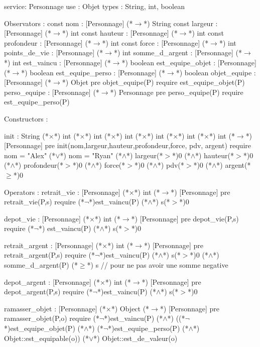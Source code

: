 \documentclass[a4paper, 11pt]{report}
\begin{document}
\begin{Spe}
service: Personnage
use : Objet
types : String, int, boolean

Observators : 
	const nom : [Personnage] (*$\rightarrow$*) String
	const largeur : [Personnage] (*$\rightarrow$*) int
	const hauteur : [Personnage] (*$\rightarrow$*) int
	const profondeur : [Personnage] (*$\rightarrow$*) int
	const force : [Personnage] (*$\rightarrow$*) int 
	points_de_vie : [Personnage] (*$\rightarrow$*) int
	somme_d_argent : [Personnage] (*$\rightarrow$*) int 
	est_vaincu : [Personnage] (*$\rightarrow$*) boolean 
	est_equipe_objet : [Personnage] (*$\rightarrow$*) boolean
	est_equipe_perso : [Personnage] (*$\rightarrow$*) boolean 
	objet_equipe : [Personnage] (*$\rightarrow$*) Objet
		pre objet_equipe(P) require est_equipe_objet(P)
	perso_equipe : [Personnage] (*$\rightarrow$*) Personnage
		pre perso_equipe(P) require est_equipe_perso(P) 

Constructors : 

	init : String (*$\times$*) int (*$\times$*) int (*$\times$*) int (*$\times$*) int (*$\times$*) int (*$\times$*) int (*$\rightarrow$*) [Personnage]
		pre init(nom,largeur,hauteur,profondeur,force, pdv, argent) require nom = "Alex" (*$\lor$*) nom = "Ryan" (*$\land$*) largeur(*$>$*)0 (*$\land$*) hauteur(*$>$*)0 (*$\land$*) profondeur(*$>$*)0 (*$\land$*) force(*$>$*)0 (*$\land$*) pdv(*$>$*)0 (*$\land$*) argent(*$\ge$*)0 

Operators :
	retrait_vie :  [Personnage] (*$\times$*) int (*$\rightarrow$*) [Personnage]
		pre retrait_vie(P,s) require (*$\lnot$*)est_vaincu(P) (*$\land$*) s(*$>$*)0
		
	depot_vie : [Personnage] (*$\times$*) int (*$\rightarrow$*) [Personnage]
		pre depot_vie(P,s) require (*$\lnot$*) est_vaincu(P) (*$\land$*) s(*$>$*)0
		
	retrait_argent :  [Personnage] (*$\times$*) int (*$\rightarrow$*) [Personnage]
		pre retrait_argent(P,s) require (*$\lnot$*)est_vaincu(P) (*$\land$*) s(*$>$*)0 (*$\land$*) somme_d_argent(P) (*$\ge$*) s // pour ne pas avoir une somme negative
		
	depot_argent : [Personnage] (*$\times$*) int (*$\rightarrow$*) [Personnage]
		pre depot_argent(P,s) require (*$\lnot$*)est_vaincu(P) (*$\land$*) s(*$>$*)0
		
	ramasser_objet : [Personnage] (*$\times$*) Object (*$\rightarrow$*) [Personnage]
		pre ramasser_objet(P,o) require (*$\lnot$*)est_vaincu(P) (*$\land$*) ((*$\lnot$*)est_equipe_objet(P) (*$\land$*)  (*$\lnot$*)est_equipe_perso(P) (*$\land$*) Objet::est_equipable(o)) (*$\lor$*) Objet::est_de_valeur(o)
		

\end{Spe}
\end{document}
